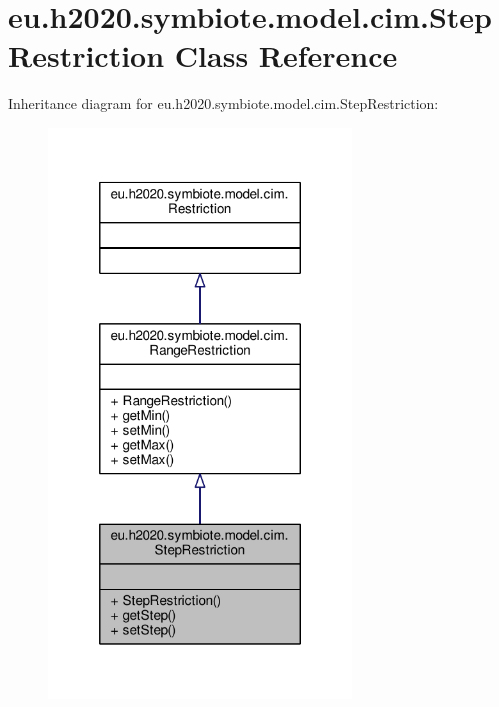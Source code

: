 \hypertarget{classeu_1_1h2020_1_1symbiote_1_1model_1_1cim_1_1StepRestriction}{}\section{eu.\+h2020.\+symbiote.\+model.\+cim.\+Step\+Restriction Class Reference}
\label{classeu_1_1h2020_1_1symbiote_1_1model_1_1cim_1_1StepRestriction}


Inheritance diagram for eu.\+h2020.\+symbiote.\+model.\+cim.\+Step\+Restriction\+:
\nopagebreak
\begin{figure}[H]
\begin{center}
\leavevmode
\includegraphics[width=228pt]{classeu_1_1h2020_1_1symbiote_1_1model_1_1cim_1_1StepRestriction__inherit__graph}
\end{center}
\end{figure}


